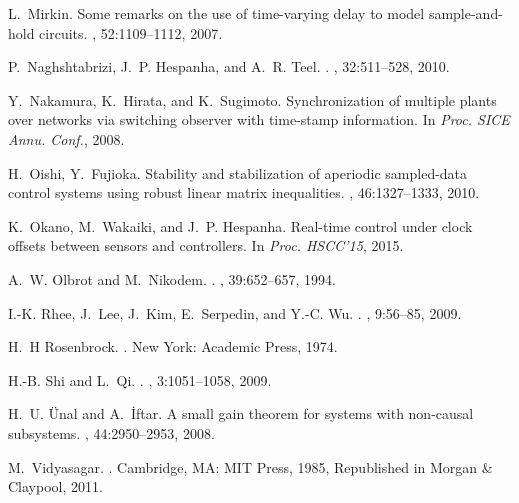 \documentclass[letterpaper, 12pt, draftcls, onecolumn]{ieeeconf}
\begin{document}
\begin{thebibliography}{10}
	L.~Mirkin.
	\newblock Some remarks on the use of time-varying delay to model
	sample-and-hold circuits.
	, 52:1109--1112, 2007.
	
	P.~Naghshtabrizi, J.~P. Hespanha, and A.~R. Teel.
	.
	, 32:511--528, 2010.
	
	Y.~Nakamura, K.~Hirata, and K.~Sugimoto.
	\newblock Synchronization of multiple plants over networks via switching
	observer with time-stamp information.
	\newblock In {\em Proc. SICE Annu. Conf.}, 2008.
	
	H.~Oishi, Y.~Fujioka.
	\newblock Stability and stabilization of aperiodic sampled-data control systems
	using robust linear matrix inequalities.
	, 46:1327--1333, 2010.
	
	K.~Okano, M.~Wakaiki, and J.~P. Hespanha.
	\newblock Real-time control under clock offsets between sensors and
	controllers.
	\newblock In {\em Proc. HSCC'15}, 2015.
	
	A.~W. Olbrot and M.~Nikodem.
	.
	, 39:652--657, 1994.
	
	I.-K. Rhee, J.~Lee, J.~Kim, E.~Serpedin, and Y.-C. Wu.
	.
	, 9:56--85, 2009.
	
	H.~H Rosenbrock.
	.
	\newblock New York: Academic Press, 1974.
	
	H.-B. Shi and L.~Qi.
	.
	, 3:1051--1058, 2009.
	
	H.~U. \"Unal and A.~\.Iftar.
	\newblock A small gain theorem for systems with non-causal subsystems.
	, 44:2950--2953, 2008.
	
	M.~Vidyasagar.
	.
	\newblock Cambridge, MA: MIT Press, 1985, Republished in Morgan \& Claypool,
	2011.
	

\end{thebibliography}
\end{document}
